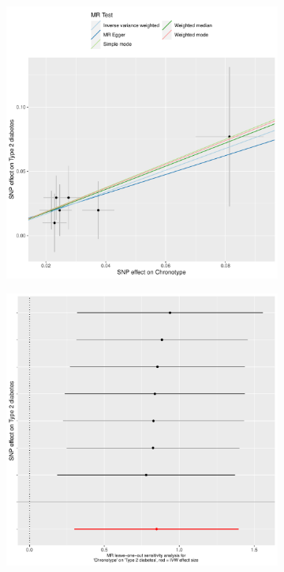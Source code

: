 \documentclass[genes,article,accept,moreauthors,pdftex]{Definitions/mdpi}
\begin{document}
\begin{figure}[H]
{\captionsetup{position=bottom,justification=centering}
\begin{subfigure}{.5\linewidth}
	\includegraphics[width=\linewidth]{Figs/Analysis2/Chronotype_vs_Type_2_diabetes.Scatterplots.pdf}
\caption{}
\label{t2dmScatter}
\end{subfigure}
\begin{subfigure}{.5\linewidth}
	\includegraphics[width=0.95\linewidth,keepaspectratio]{Figs/Analysis2/Chronotype_vs_Type_2_diabetes.LOOplots.pdf}

\end{subfigure}}
\end{figure}
\end{document}
